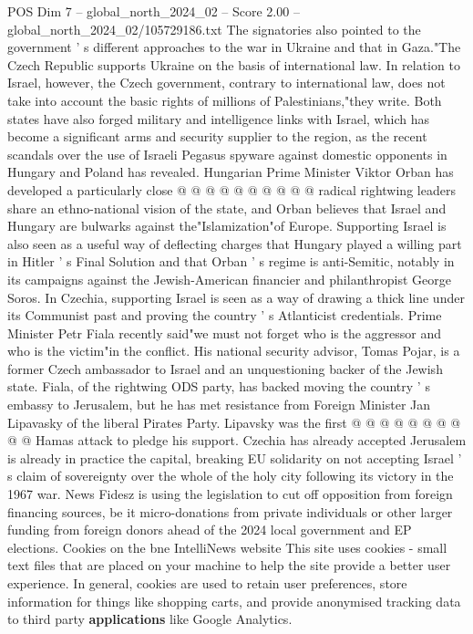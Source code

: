 \begin{textsample}{POS Dim 7 – global\_north\_2024\_02 – Score 2.00 – global\_north\_2024\_02/105729186.txt}
The signatories also pointed to the government ' s different approaches to the war in Ukraine and that in Gaza."The Czech Republic supports Ukraine on the basis of international law.
In relation to Israel, however, the Czech government, contrary to international law, does not take into account the basic rights of millions of Palestinians,"they write.
Both states have also forged military and intelligence links with Israel, which has become a significant arms and security supplier to the region, as the recent scandals over the use of Israeli Pegasus spyware against domestic opponents in Hungary and Poland has revealed.
Hungarian Prime Minister Viktor Orban has developed a particularly close @ @ @ @ @ @ @ @ @ @ radical rightwing leaders share an ethno-national vision of the state, and Orban believes that Israel and Hungary are bulwarks against the"Islamization"of Europe.
Supporting Israel is also seen as a useful way of deflecting charges that Hungary played a willing part in Hitler ' s Final Solution and that Orban ' s regime is anti-Semitic, notably in its campaigns against the Jewish-American financier and philanthropist George Soros.
In Czechia, supporting Israel is seen as a way of drawing a thick line under its Communist past and proving the country ' s Atlanticist credentials.
Prime Minister Petr Fiala recently said"we must not forget who is the aggressor and who is the victim"in the conflict.
His national security advisor, Tomas Pojar, is a former Czech ambassador to Israel and an unquestioning backer of the Jewish state.
Fiala, of the rightwing ODS party, has backed moving the country ' s embassy to Jerusalem, but he has met resistance from Foreign Minister Jan Lipavasky of the liberal Pirates Party.
Lipavsky was the first @ @ @ @ @ @ @ @ @ @ Hamas attack to pledge his support.
Czechia has already accepted Jerusalem is already in practice the capital, breaking EU solidarity on not accepting Israel ' s claim of sovereignty over the whole of the holy city following its victory in the 1967 war.
News Fidesz is using the legislation to cut off opposition from foreign financing sources, be it micro-donations from private individuals or other larger funding from foreign donors ahead of the 2024 local government and EP elections.
Cookies on the bne IntelliNews website This site uses cookies - small text files that are placed on your machine to help the site provide a better user experience.
In general, cookies are used to retain user preferences, store information for things like shopping carts, and provide anonymised tracking data to third party \textbf{applications} like Google Analytics.

\end{textsample}
